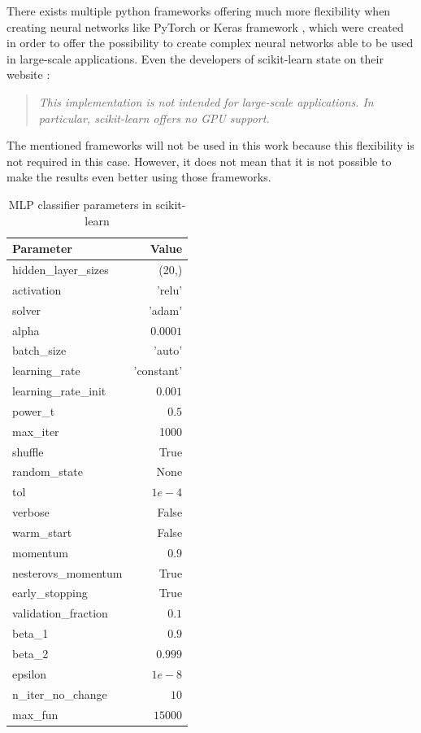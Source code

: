 There exists multiple python frameworks offering much more flexibility when creating neural networks like PyTorch \cite{noauthor_pytorch_nodate} or Keras framework \cite{noauthor_keras_nodate}, which were created in order to offer the possibility to create complex neural networks able to be used in large-scale applications. Even the developers of scikit-learn state on their website \cite{noauthor_neural_nodate}:

\begin{quote}
    \textit{This implementation is not intended for large-scale applications. In particular, \mbox{scikit-learn} offers no GPU support.} 
\end{quote}

The mentioned frameworks will not be used in this work because this flexibility is not required in this case. However, it does not mean that it is not possible to make the results even better using those frameworks.

\begin{table}[H]
    \footnotesize
    \centering
    \caption[MLP classifier used parameters in scikit-learn]{MLP classifier parameters in scikit-learn \cite{noauthor_sklearnneural_networkmlpclassifier_nodate}} \label{tab:mlp_param} 
    \begin{tabular}{lr}\toprule
        Parameter & Value \\\midrule
        hidden\_layer\_sizes & (20,) \\
        activation & 'relu' \\
        solver & 'adam' \\
        alpha & $0.0001$ \\
        batch\_size & 'auto' \\
        learning\_rate & 'constant' \\
        learning\_rate\_init & $0.001$ \\
        power\_t & $0.5$ \\
        max\_iter & 1000 \\
        shuffle & True \\
        random\_state & None \\
        tol & $1e-4$ \\
        verbose & False \\
        warm\_start & False \\
        momentum & $0.9$ \\
        nesterovs\_momentum & True \\
        early\_stopping & True \\
        validation\_fraction & $0.1$ \\
        beta\_1 & $0.9$ \\
        beta\_2 & $0.999$ \\
        epsilon & $1e-8$ \\
        n\_iter\_no\_change & $10$ \\
        max\_fun & $15000$ \\\bottomrule
    \end{tabular}
\end{table}

